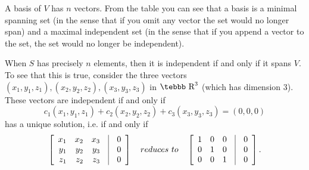A basis of $V$ has $n$ vectors. From the table you can see that a
basis is a minimal spanning set (in the sense that if you omit any
vector the set would no longer span) and a maximal independent set
(in the sense that if you append a vector to the set, the set
would no longer be independent).

When $S$ has precisely $n$ elements, then it is independent if and
only if it spans $V$. To see that this is true, consider the three
vectors ${(x_1,y_1,z_1),(x_2,y_2,z_2),(x_3,y_3,z_3)}$ in $\mbox
{\tebbb R}^3$ (which has dimension $3$). These vectors are
independent if and only if
$$c_1(x_1,y_1,z_1)+c_2(x_2,y_2,z_2)+c_3(x_3,y_3,z_3)=(0,0,0)$$
has a unique solution, i.e. if and only if
$$ \left[ \begin{array}{rrrcr} x_1 & x_2 & x_3 & \vline & 0
\\ y_1 & y_2 & y_3 & \vline & 0 \\ z_1 & z_2 & z_3 & \vline & 0
\end{array}  \right] \quad reduces~to \quad \left [
\begin{array}{rrrcr}
1 & 0 & 0 & \vline & 0 \\ 0 & 1 & 0 & \vline & 0 \\
0 & 0 & 1 & \vline & 0 \end{array} \right ]. $$

